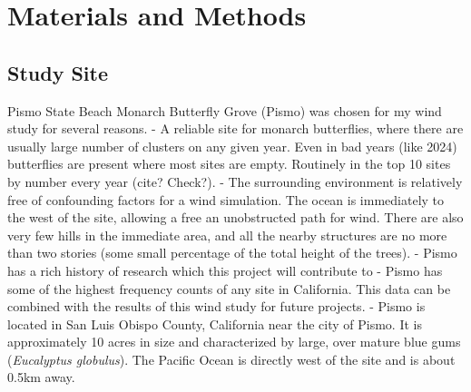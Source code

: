 \section{Materials and Methods}
\subsection{Study Site}
Pismo State Beach Monarch Butterfly Grove (Pismo) was chosen for my wind study for several reasons. 
- A reliable site for monarch butterflies, where there are usually large number of clusters on any given year. Even in bad years (like 2024) butterflies are present where most sites are empty. Routinely in the top 10 sites by number every year (cite? Check?). 
- The surrounding environment is relatively free of confounding factors for a wind simulation. The ocean is immediately to the west of the site, allowing a free an unobstructed path for wind. There are also very few hills in the immediate area, and all the nearby structures are no more than two stories (some small percentage of the total height of the trees). 
- Pismo has a rich history of research which this project will contribute to
- Pismo has some of the highest frequency counts of any site in California. This data can be combined with the results of this wind study for future projects. 
- Pismo is located in San Luis Obispo County, California near the city of Pismo. It is approximately 10 acres in size and characterized by large, over mature blue gums (\textit{Eucalyptus globulus}). The Pacific Ocean is directly west of the site and is about 0.5km away. 


